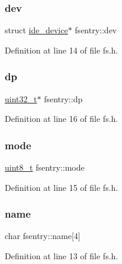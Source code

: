 \subsubsection{\texorpdfstring{dev}{dev}}
{\footnotesize\ttfamily struct \hyperlink{a00214}{ide\+\_\+device}$\ast$ fsentry\+::dev}



Definition at line 14 of file fs.\+h.

\mbox{\label{a00262_ae1d22893563b8753e29fef01f0782ba5_ae1d22893563b8753e29fef01f0782ba5}} 
\subsubsection{\texorpdfstring{dp}{dp}}
{\footnotesize\ttfamily \hyperlink{a00134_a435d1572bf3f880d55459d9805097f62_a435d1572bf3f880d55459d9805097f62}{uint32\+\_\+t}$\ast$ fsentry\+::dp}



Definition at line 16 of file fs.\+h.

\mbox{\label{a00262_a6e71712bc3c51c21dc3362334937e4d7_a6e71712bc3c51c21dc3362334937e4d7}} 
\subsubsection{\texorpdfstring{mode}{mode}}
{\footnotesize\ttfamily \hyperlink{a00134_aba7bc1797add20fe3efdf37ced1182c5_aba7bc1797add20fe3efdf37ced1182c5}{uint8\+\_\+t} fsentry\+::mode}



Definition at line 15 of file fs.\+h.

\mbox{\label{a00262_a9c5a4f5b02eb2c9e9e797f79dc99028a_a9c5a4f5b02eb2c9e9e797f79dc99028a}} 
\subsubsection{\texorpdfstring{name}{name}}
{\footnotesize\ttfamily char fsentry\+::name\mbox{[}4\mbox{]}}



Definition at line 13 of file fs.\+h.

